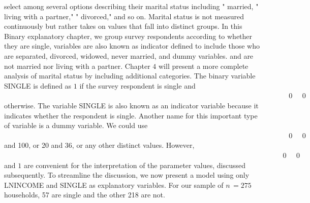 \documentclass[11pt]{article}
\begin{document}
 select among several options describing their marital status including " married,
" living with a partner," " divorced," and so on. Marital status is not measured
continuously but rather takes on values that fall into distinct groups. In this Binary explanatory
chapter, we group survey respondents according to whether they are single, variables are also
 known as indicator
defined to include those who are separated, divorced, widowed, never married, and dummy variables.
 and are not married nor living with a partner. Chapter \(4\) will present a more
 complete analysis of marital status by including additional categories.
 The binary variable SINGLE is defined as \(1\) if the survey respondent is single
and \(\; \; \; \; \; \; \; \; \; \; \; \; \; \; \; \; \; \; \; \; \; \; \; \; \; \; \; \; \; \; \; \; \; \; \; \; \; \; \; \; \; \; \; \; \; \; \; \; \; \; \; \; \; \; \; \; \; \; \; \; \; \; \; \; \; \; \; \; \; \; \; \; \; \; \; \; \; \; \; \; \; \; \; \; \; \; \; \; \; \; \; \; \; \; \; \; \; \; \; \; \; \; \; \; \; \; \; \; \; \; \; \; \; \; \; \; \; \; \; \; \; \; \; \; \; \; \; \; \; \; \; \; \; \; \; \; \; \; \; \; \; \; \; \; 0 \; \; \; \; \; 0\) otherwise. The variable SINGLE is also known as an indicator variable
because it indicates whether the respondent is single. Another name for this
 important type of variable is a dummy variable. We could use \(\; \; \; \; \; \; \; \; \; \; \; \; \; \; \; \; \; \; \; \; \; \; \; \; \; \; \; \; \; \; \; \; \; \; \; \; \; \; \; \; \; \; \; \; \; \; \; \; \; \; \; \; \; \; \; \; \; \; \; \; \; \; \; \; \; \; \; \; \; \; \; \; \; \; \; \; \; \; \; \; \; \; \; \; \; \; \; \; \; \; \; \; \; \; \; \; \; \; \; \; \; \; \; \; \; \; \; \; \; \; \; \; \; \; \; \; \; \; \; \; \; \; \; \; \; \; \; \; \; \; \; \; \; \; \; \; \; \; \; \; \; \; \; \; 0 \; \; \; \; \; 0\) and 100, or 20
 and 36, or any other distinct values. However, \(\; \; \; \; \; \; \; \; \; \; \; \; \; \; \; \; \; \; \; \; \; \; \; \; \; \; \; \; \; \; \; \; \; \; \; \; \; \; \; \; \; \; \; \; \; \; \; \; \; \; \; \; \; \; \; \; \; \; \; \; \; \; \; \; \; \; \; \; \; \; \; \; \; \; \; \; \; \; \; \; \; \; \; \; \; \; \; \; \; \; \; \; \; \; \; \; \; \; \; \; \; \; \; \; \; \; \; \; \; \; \; \; \; \; \; \; \; \; \; \; \; \; \; \; \; \; \; \; \; \; \; \; \; \; \; \; \; \; \; \; \; 0 \; \; \; \; \; 0\) and \(1\) are convenient for the
 interpretation of the parameter values, discussed subsequently. To streamline the
 discussion, we now present a model using only LNINCOME and SINGLE as
 explanatory variables.
 For our sample of \(n \,=2 7 5\) households, 57 are single and the other 218 are not.
\end{document}

